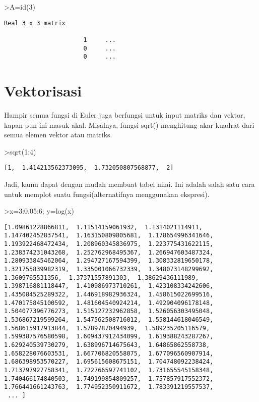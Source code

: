 \documentclass[
]{book}
\begin{document}
\textgreater A=id(3)

\begin{verbatim}
Real 3 x 3 matrix

                      1     ...
                      0     ...
                      0     ...
\end{verbatim}

\chapter{Vektorisasi}\label{vektorisasi}

Hampir semua fungsi di Euler juga berfungsi untuk input matriks dan vektor, kapan pun ini masuk akal. Misalnya, fungsi sqrt() menghitung akar kuadrat dari semua elemen vektor atau matriks.

\textgreater sqrt(1:4)

\begin{verbatim}
[1,  1.414213562373095,  1.732050807568877,  2]
\end{verbatim}

Jadi, kamu dapat dengan mudah membuat tabel nilai. Ini adalah salah satu cara untuk memplot suatu fungsi(alternatifnya menggunakan ekspresi).

\textgreater x=3:0.05:6; y=log(x)

\begin{verbatim}
[1.09861228866811,  1.11514159061932,  1.1314021114911,
1.147402452837541,  1.163150809805681,  1.178654996341646,
1.193922468472434,  1.208960345836975,  1.223775431622115,
1.238374231043268,  1.252762968495367,  1.266947603487324,
1.280933845462064,  1.294727167594399,  1.308332819650178,
1.321755839982319,  1.335001066732339,  1.348073148299692,
1.3609765531356,  1.37371557891303,  1.38629436111989,
1.398716881118447,  1.410986973710261,  1.423108334242606,
1.435084525289322,  1.446918982936324,  1.458615022699516,
1.470175845100592,  1.481604540924214,  1.492904096178148,
1.504077396776273,  1.515127232962858,  1.526056303495048,
1.536867219599264,  1.547562508716012,  1.558144618046549,
1.568615917913844,  1.57897870494939,  1.589235205116579,
1.599387576580598,  1.609437912434099,  1.619388243287267,
1.629240539730279,  1.638996714675643,  1.64865862558738,
1.658228076603531,  1.667706820558075,  1.677096560907914,
1.686398953570227,  1.695615608675151,  1.704748092238424,
1.713797927758341,  1.722766597741102,  1.731655545158348,
1.740466174840503,  1.749199854809257,  1.757857917552372,
1.766441661243763,  1.774952350911672,  1.783391219557537,
 ... ]
\end{verbatim}
\end{document}
